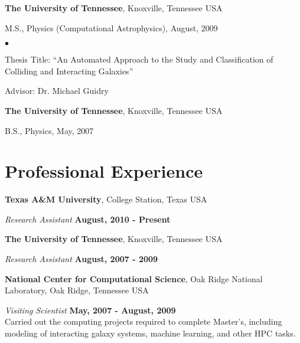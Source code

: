\documentclass[margin,line, 11pt]{Boada_res}
\newenvironment{list1}{
  \begin{list}{\ding{113}}{%
      \setlength{\itemsep}{0in}
      \setlength{\parsep}{0in} \setlength{\parskip}{0in}
      \setlength{\topsep}{0in} \setlength{\partopsep}{0in} 
      \setlength{\leftmargin}{0.17in}}}{\end{list}}
\newenvironment{list2}{
  \begin{list}{$\bullet$}{%
      \setlength{\itemsep}{0in}
      \setlength{\parsep}{0in} \setlength{\parskip}{0in}
      \setlength{\topsep}{0in} \setlength{\partopsep}{0in} 
      \setlength{\leftmargin}{0.2in}}}{\end{list}}
\begin{document}
\begin{resume}
\textbf{The University of Tennessee}, Knoxville, Tennessee USA\\
\vspace*{-.1in}
\begin{list1}
    \item[] M.S., Physics (Computational Astrophysics),  August, 2009
    \begin{list2}
        \vspace*{.05in}
        \item Thesis Title: ``An Automated Approach to the Study and Classification of Colliding and Interacting Galaxies''
        \item Advisor: Dr. Michael Guidry
    \end{list2}
\end{list1}
\vspace*{-3mm}

{\bf The University of Tennessee}, Knoxville, Tennessee USA\\
\vspace*{-.1in}
\begin{list1}
    \item[] B.S., Physics,  May, 2007
\end{list1}
\vspace*{-3mm}

\section{\sc Professional Experience}
\textbf{Texas A\&M University}, College Station, Texas USA
\vspace{-3mm}

{\em Research Assistant} \hfill \textbf{August, 2010 - Present}
\vspace*{-1mm}

\textbf{The University of Tennessee}, Knoxville, Tennessee USA
\vspace{-3mm}

{\em Research Assistant} \hfill \textbf{August, 2007 - 2009}
\vspace*{-1mm}

\textbf{National Center for Computational Science}, Oak Ridge National Laboratory,
Oak Ridge, Tennessee USA
\vspace*{-4mm}

{\em Visiting Scientist} \hfill \textbf{May, 2007 - August, 2009}\\
Carried out the computing projects required to complete Master's, including
modeling of interacting galaxy systems, machine learning, and other HPC tasks. 
\vspace*{-3mm}


\end{resume}
\end{document}
